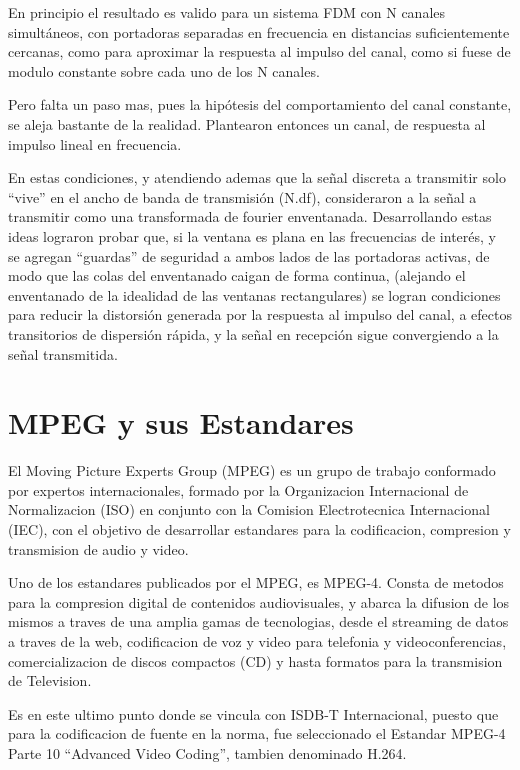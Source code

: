 En principio el resultado es valido para un sistema FDM con N canales simultáneos, con portadoras separadas en frecuencia en distancias suficientemente cercanas, como para aproximar la respuesta al impulso del canal, como si fuese de modulo constante sobre cada uno de los N canales. 

Pero falta un paso mas, pues la hipótesis del comportamiento del canal constante, se aleja bastante de la realidad. Plantearon entonces un canal, de respuesta al impulso lineal en frecuencia.

En estas condiciones, y atendiendo ademas que la señal discreta a transmitir solo “vive” en el ancho de banda de transmisión (N.df), consideraron a la señal a transmitir como una transformada de fourier enventanada. Desarrollando estas ideas lograron probar que, si la ventana es plana en las frecuencias de interés, y se agregan “guardas” de seguridad a ambos lados de las portadoras activas, de modo que las colas del enventanado caigan de forma continua, (alejando el enventanado de la idealidad de las ventanas rectangulares) se logran condiciones para reducir la distorsión generada por la respuesta al impulso del canal, a efectos transitorios de dispersión rápida, y la señal en recepción sigue convergiendo a la señal transmitida.

\section{MPEG y sus Estandares}

El Moving Picture Experts Group (MPEG)\cite{MPEG} es un grupo de trabajo conformado por expertos internacionales, formado por la Organizacion Internacional de Normalizacion (ISO) en conjunto con la Comision Electrotecnica Internacional (IEC), con el objetivo de desarrollar estandares para la codificacion, compresion y transmision de audio y video.

Uno de los estandares publicados por el MPEG, es MPEG-4. Consta de metodos para la compresion digital de contenidos audiovisuales,  y abarca la difusion de los mismos a traves de una amplia gamas de tecnologias, desde el streaming de datos a traves de la web, codificacion de voz y video para telefonia y videoconferencias, comercializacion de discos compactos (CD) y hasta formatos para la transmision de Television. 

Es en este ultimo punto donde se vincula con ISDB-T Internacional, puesto que para la codificacion de fuente en la norma, fue seleccionado el Estandar MPEG-4 Parte 10 “Advanced Video Coding”, tambien denominado H.264.

